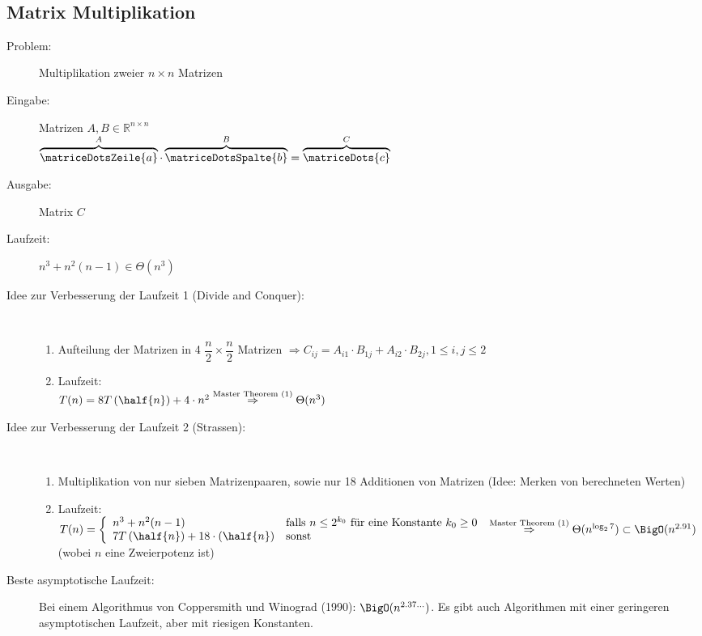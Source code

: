 \\\vspace*{-1.5\baselineskip}
\subsection{Matrix Multiplikation}
\begin{description}
	\item[Problem:] Multiplikation zweier $n\times n $ Matrizen
	\item[Eingabe:] Matrizen $A,B \in \mathbb{R}^{n\times n}$\\
		$\overbrace{\matriceDotsZeile{a}}^{A} \cdot \overbrace{\matriceDotsSpalte{b}}^{B} = \overbrace{\matriceDots{c}}^{C}$
	\item[Ausgabe:] Matrix $C$
	\item[Laufzeit:] $n^3+n^2(n-1) \in \Theta(n^3)$
	\item[Idee zur Verbesserung der Laufzeit 1 (Divide and Conquer):]\ \\\vspace*{-\baselineskip}
		\begin{enumerate}
			\item Aufteilung der Matrizen in 4 $\dfrac{n}{2}\times \dfrac{n}{2}$ Matrizen $\Rightarrow C_{ij} = A_{i1} \cdot B_{1j} + A_{i2} \cdot B_{2j}, 1\leq i,j\leq 2$
			\item Laufzeit:\\
			$T(n)= 8T\left(\half{n}\right)+4\cdot n^2\\
			\overset{\text{Master Theorem (1)}}{\Rightarrow} \Theta(n^3)$
		\end{enumerate}
\end{description}
\topbreak
\vspace*{-1\baselineskip}
\begin{description}
	\item[Idee zur Verbesserung der Laufzeit 2 (Strassen):]\ \\\vspace*{-\baselineskip}
		\begin{enumerate}
			\item Multiplikation von nur sieben Matrizenpaaren, sowie nur 18 Additionen von Matrizen (Idee: Merken von berechneten Werten)
			\item Laufzeit:\\$T(n)=
				\left\lbrace
					\begin{array}{ll}
						n^3 + n^2(n-1) & \text{falls } n\leq 2^{k_0} \text{ für eine Konstante } k_0 \geq 0\\
						7T\left(\half{n}\right)+18\cdot \left(\half{n}\right) & \text{sonst}
					\end{array}
				\right. 
				\\
				\overset{\text{Master Theorem (1)}}{\Rightarrow} \Theta(n^{\log_2 7})\subset\BigO(n^{2.91})$ (wobei $n$ eine Zweierpotenz ist)
		\end{enumerate}
	\item[Beste asymptotische Laufzeit:] Bei einem Algorithmus von Coppersmith und Winograd (1990): $\BigO(n^{2.37\dots})$. Es gibt auch Algorithmen mit einer geringeren asymptotischen Laufzeit, aber mit riesigen Konstanten.
\end{description}

